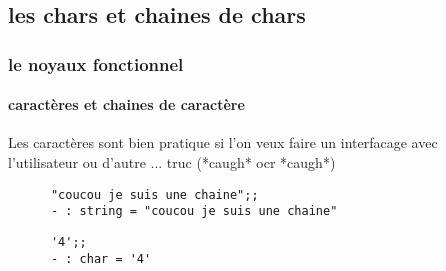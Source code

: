   \subsection{les chars et chaines de chars}
\begin{frame}[fragile]
    \frametitle{le noyaux fonctionnel}
    \framesubtitle{caractères et chaines de caractère}
    Les caractères sont bien pratique si l'on veux faire un interfacage avec l'utilisateur ou d'autre ... truc (*caugh* ocr *caugh*)\\
    \begin{minipage}[t]{10cm}
      \begin{lstlisting}
      "coucou je suis une chaine";;
      - : string = "coucou je suis une chaine"
      \end{lstlisting}
    \end{minipage}
    \begin{minipage}[t]{5cm}
      \begin{lstlisting}
      '4';;
      - : char = '4'
      \end{lstlisting}
    \end{minipage}
\end{frame}

